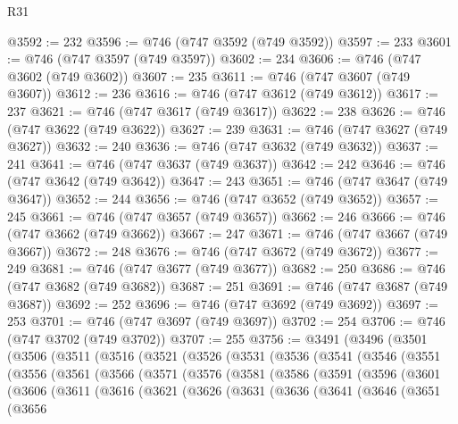 \begin{lexlean}{R31}
\begin{coremodule}
@3592 := 232
@3596 := @746 (@747 @3592 (@749 @3592))
@3597 := 233
@3601 := @746 (@747 @3597 (@749 @3597))
@3602 := 234
@3606 := @746 (@747 @3602 (@749 @3602))
@3607 := 235
@3611 := @746 (@747 @3607 (@749 @3607))
@3612 := 236
@3616 := @746 (@747 @3612 (@749 @3612))
@3617 := 237
@3621 := @746 (@747 @3617 (@749 @3617))
@3622 := 238
@3626 := @746 (@747 @3622 (@749 @3622))
@3627 := 239
@3631 := @746 (@747 @3627 (@749 @3627))
@3632 := 240
@3636 := @746 (@747 @3632 (@749 @3632))
@3637 := 241
@3641 := @746 (@747 @3637 (@749 @3637))
@3642 := 242
@3646 := @746 (@747 @3642 (@749 @3642))
@3647 := 243
@3651 := @746 (@747 @3647 (@749 @3647))
@3652 := 244
@3656 := @746 (@747 @3652 (@749 @3652))
@3657 := 245
@3661 := @746 (@747 @3657 (@749 @3657))
@3662 := 246
@3666 := @746 (@747 @3662 (@749 @3662))
@3667 := 247
@3671 := @746 (@747 @3667 (@749 @3667))
@3672 := 248
@3676 := @746 (@747 @3672 (@749 @3672))
@3677 := 249
@3681 := @746 (@747 @3677 (@749 @3677))
@3682 := 250
@3686 := @746 (@747 @3682 (@749 @3682))
@3687 := 251
@3691 := @746 (@747 @3687 (@749 @3687))
@3692 := 252
@3696 := @746 (@747 @3692 (@749 @3692))
@3697 := 253
@3701 := @746 (@747 @3697 (@749 @3697))
@3702 := 254
@3706 := @746 (@747 @3702 (@749 @3702))
@3707 := 255
@3756 := @3491
    (@3496
      (@3501
        (@3506
          (@3511
            (@3516
              (@3521
                (@3526
                  (@3531
                    (@3536
                      (@3541
                        (@3546
                          (@3551
                            (@3556
                              (@3561
                                (@3566
                                  (@3571
                                    (@3576
                                      (@3581
                                        (@3586
                                          (@3591
                                            (@3596
                                              (@3601
                                                (@3606
                                                  (@3611
                                                    (@3616
                                                      (@3621
                                                        (@3626
                                                          (@3631
                                                            (@3636
                                                              (@3641
                                                                (@3646
                                                                  (@3651
                                                                    (@3656

\end{coremodule}
\end{lexlean}
